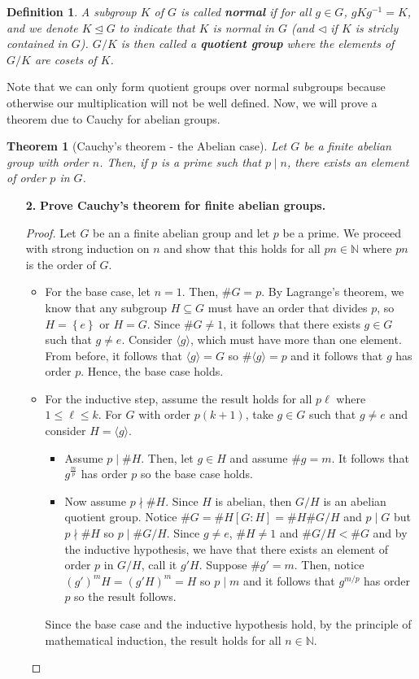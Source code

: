 \documentclass[letterpaper,12pt]{article}
\newcommand{\set}[1]{\left\{ #1 \right\}}
\newtheorem{theorem}{Theorem}[section]
\newtheorem{definition}{Definition}[section]
\begin{document}
\begin{definition}
    A subgroup $K$ of $G$ is called \textbf{normal} if for all $g \in G$, $gKg^{-1} = K$, and we denote $K \trianglelefteq G$ to indicate that $K$ is normal in $G$ (and $\triangleleft$ if $K$ is stricly contained in $G$). $G/K$ is then called a \textbf{quotient group} where the elements of $G/K$ are cosets of $K$.
\end{definition}
Note that we can only form quotient groups over normal subgroups because otherwise our multiplication will not be well defined. Now, we will prove a theorem due to Cauchy for abelian groups. \begin{theorem}[Cauchy's theorem - the Abelian case]
    Let $G$ be a finite abelian group with order $n$. Then, if $p$ is a prime such that $p \mid n$, there exists an element of order $p$ in $G$.
\end{theorem}
\begin{enumerate}
    \item[\textbf{2.}] \textbf{Prove Cauchy's theorem for finite abelian groups.}
\begin{proof}
    Let $G$ be an a finite abelian group and let $p$ be a prime. We proceed with strong induction on $n$ and show that this holds for all $pn \in \mathbb{N}$ where $pn$ is the order of $G$.  \begin{itemize}
        \item For the base case, let $n = 1$. Then, $\# G = p$. By Lagrange's theorem, we know that any subgroup $H \subseteq G$ must have an order that divides $p$, so $H = \set{e}$ or $H = G$. Since $\# G \neq 1$, it follows that there exists $g \in G$ such that $g \neq e$. Consider $\langle g \rangle$, which must have more than one element. From before, it follows that $\langle g \rangle = G$ so $\# \langle g \rangle = p$ and it follows that $g$ has order $p$. Hence, the base case holds.
        \item For the inductive step, assume the result holds for all $p\ell$ where $1 \leq \ell \leq k$. For $G$ with order $p(k+1)$, take $g \in G$ such that $g \neq e$ and consider $H=\langle g \rangle$.
        \begin{itemize}
            \item Assume $p \mid \# H$. Then, let $g \in H$ and assume $\# g=m$. It follows that $g^\frac{m}{p}$ has order $p$ so the base case holds.
            \item Now assume $p \nmid \# H$. Since $H$ is abelian, then $G/H$ is an abelian quotient group. Notice $\# G = \#H[G:H] = \# H \#G/H$ and $p \mid G$ but $p \nmid \#H$ so $p \mid \# G/H$. Since $g \neq e$, $\# H \neq 1$ and $\# G/H < \#G$ and by the inductive hypothesis, we have that there exists an element of order $p$ in $G/H$, call it $g'H$. Suppose $\#g'=m$. Then, notice $(g')^mH = (g'H)^m = H$ so $p \mid m$ and it follows that $g^{m/p}$ has order $p$ so the result follows.
        \end{itemize}
        Since the base case and the inductive hypothesis hold, by the principle of mathematical induction, the result holds for all $n \in \mathbb{N}$.
    \end{itemize}
\end{proof}
\end{enumerate}
\end{document}
